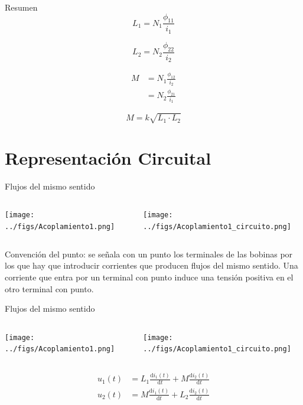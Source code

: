 \documentclass[xcolor={usenames,svgnames,dvipsnames}]{beamer}
\begin{document}
\begin{frame}[label={sec:orgaad0a13}]{Resumen}
\[
  L_1 = N_1 \frac{\phi_{11}}{i_1}
\]

\[
  L_2 = N_2 \frac{\phi_{22}}{i_2}
\]


\begin{align*}
  M &= N_1 \frac{\phi_{12}}{i_2}\\
    &= N_2 \frac{\phi_{21}}{i_1}
\end{align*}

\[
  M = k \sqrt{L_1 \cdot L_2}
\]
\end{frame}

\section{Representación Circuital}
\label{sec:org57596c8}
\begin{frame}[label={sec:org7586d4f}]{Flujos del mismo sentido}
\begin{columns}
\begin{column}{0.5\columnwidth}
\begin{center}
\texttt{[image: ../figs/Acoplamiento1.png]}
\end{center}
\end{column}

\begin{column}{0.5\columnwidth}
\begin{center}
\texttt{[image: ../figs/Acoplamiento1\_circuito.png]}
\end{center}
\end{column}
\end{columns}

\alert{Convención del punto}: se señala con un punto los terminales de las
bobinas por los que hay que introducir corrientes que producen flujos
del mismo sentido. Una corriente que entra por un terminal con punto
induce una tensión positiva en el otro terminal con punto.
\end{frame}
\begin{frame}[label={sec:org61b823a}]{Flujos del mismo sentido}
\begin{columns}
\begin{column}{0.5\columnwidth}
\begin{center}
\texttt{[image: ../figs/Acoplamiento1.png]}
\end{center}
\end{column}

\begin{column}{0.5\columnwidth}
\begin{center}
\texttt{[image: ../figs/Acoplamiento1\_circuito.png]}
\end{center}
\end{column}
\end{columns}

\begin{align*}
  u_1(t) &= L_1 \frac{\mathrm{d}i_1(t)}{\mathrm{d}t} + M \frac{\mathrm{d}i_2(t)}{\mathrm{d}t}\\
  u_2(t) &= M \frac{\mathrm{d}i_1(t)}{\mathrm{d}t} + L_2 \frac{\mathrm{d}i_2(t)}{\mathrm{d}t}
\end{align*}
\end{frame}
\end{document}
